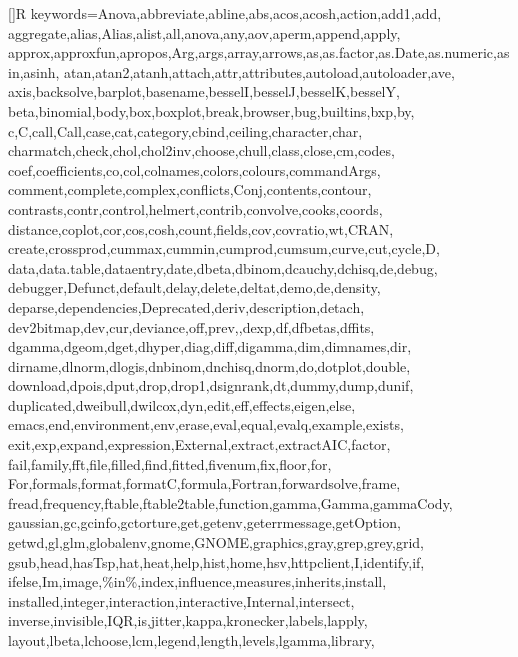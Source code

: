 
[]{R}%
  {keywords={Anova,abbreviate,abline,abs,acos,acosh,action,add1,add,%
      aggregate,alias,Alias,alist,all,anova,any,aov,aperm,append,apply,%
      approx,approxfun,apropos,Arg,args,array,arrows,as,as.factor,as.Date,as.numeric,asin,asinh,%
      atan,atan2,atanh,attach,attr,attributes,autoload,autoloader,ave,%
      axis,backsolve,barplot,basename,besselI,besselJ,besselK,besselY,%
      beta,binomial,body,box,boxplot,break,browser,bug,builtins,bxp,by,%
      c,C,call,Call,case,cat,category,cbind,ceiling,character,char,%
      charmatch,check,chol,chol2inv,choose,chull,class,close,cm,codes,%
      coef,coefficients,co,col,colnames,colors,colours,commandArgs,%
      comment,complete,complex,conflicts,Conj,contents,contour,%
      contrasts,contr,control,helmert,contrib,convolve,cooks,coords,%
      distance,coplot,cor,cos,cosh,count,fields,cov,covratio,wt,CRAN,%
      create,crossprod,cummax,cummin,cumprod,cumsum,curve,cut,cycle,D,%
      data,data.table,dataentry,date,dbeta,dbinom,dcauchy,dchisq,de,debug,%
      debugger,Defunct,default,delay,delete,deltat,demo,de,density,%
      deparse,dependencies,Deprecated,deriv,description,detach,%
      dev2bitmap,dev,cur,deviance,off,prev,,dexp,df,dfbetas,dffits,%
      dgamma,dgeom,dget,dhyper,diag,diff,digamma,dim,dimnames,dir,%
      dirname,dlnorm,dlogis,dnbinom,dnchisq,dnorm,do,dotplot,double,%
      download,dpois,dput,drop,drop1,dsignrank,dt,dummy,dump,dunif,%
      duplicated,dweibull,dwilcox,dyn,edit,eff,effects,eigen,else,%
      emacs,end,environment,env,erase,eval,equal,evalq,example,exists,%
      exit,exp,expand,expression,External,extract,extractAIC,factor,%
      fail,family,fft,file,filled,find,fitted,fivenum,fix,floor,for,%
      For,formals,format,formatC,formula,Fortran,forwardsolve,frame,%
      fread,frequency,ftable,ftable2table,function,gamma,Gamma,gammaCody,%
      gaussian,gc,gcinfo,gctorture,get,getenv,geterrmessage,getOption,%
      getwd,gl,glm,globalenv,gnome,GNOME,graphics,gray,grep,grey,grid,%
      gsub,head,hasTsp,hat,heat,help,hist,home,hsv,httpclient,I,identify,if,%
      ifelse,Im,image,\%in\%,index,influence,measures,inherits,install,%
      installed,integer,interaction,interactive,Internal,intersect,%
      inverse,invisible,IQR,is,jitter,kappa,kronecker,labels,lapply,%
      layout,lbeta,lchoose,lcm,legend,length,levels,lgamma,library,%
}}

